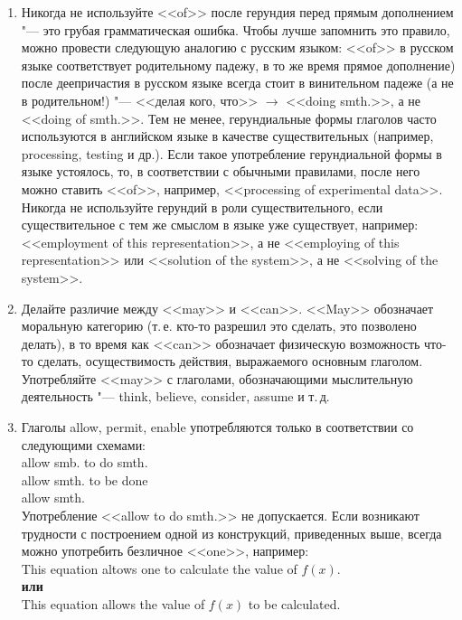 \documentclass[a5paper, 10pt, twoside, numbers=enddot]{scrartcl}
\begin{document}
\begin{enumerate}
  \item Никогда не используйте <<of>> после герундия перед прямым дополнением "--- это грубая грамматическая ошибка. Чтобы лучше запомнить это правило, можно провести следующую аналогию с русским языком: <<of>> в русском языке соответствует родительному падежу, в то же время прямое дополнение) после деепричастия в русском языке всегда стоит в винительном падеже (а не в родительном!) "--- <<делая кого, что>> $\rightarrow$ <<doing smth.>>, а не <<doing of smth.>>. Тем не менее, герундиальные формы глаголов часто используются в английском языке в качестве существительных (например, processing, testing и др.). Если такое употребление герундиальной формы в языке устоялось, то, в  соответствии с обычными правилами, после него можно ставить <<of>>, например, <<processing of experimental data>>.\\ [4pt]
  Никогда не используйте герундий в роли существительного, если существительное с тем же смыслом в языке уже существует, например: <<employment of this representation>>, а не <<employing of this representation>> или <<solution of the system>>, а не <<solving of the system>>.

  \item Делайте различие между <<may>> и <<can>>. <<May>> обозначает моральную категорию (т.\,е. кто-то разрешил это сделать, это позволено делать), в то время как <<can>> обозначает физическую возможность что-то сделать, осуществимость действия, выражаемого основным глаголом. Употребляйте <<may>> с глаголами, обозначающими мыслительную деятельность "--- think, believe, consider, assume и т.\,д.

  \item Глаголы allow, permit, enable употребляются только в соответствии со  следующими схемами:\\ [4pt] \textsf{
  allow smb. to do smth.\\
  allow smth. to be done\\
  allow smth.\\ [4pt]}
  Употребление <<allow to do smth.>> не допускается. Если возникают трудности с построением одной из конструкций, приведенных выше, всегда можно употребить безличное <<one>>, например:\\ [4pt] \textsf{
  This equation altows one to calculate the value of $f(x)$.\\ [4pt]
  \textbf{или}\\ [4pt]
  This equation allows the value of $f(x)$ to be calculated.}


\end{enumerate}
\end{document}
